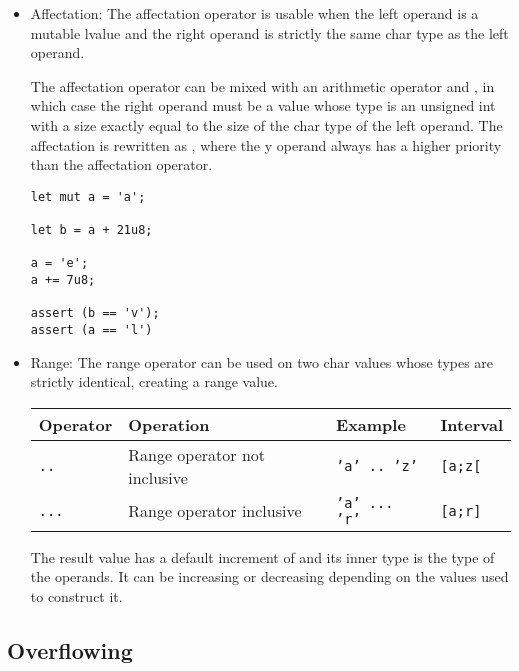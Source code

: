 \begin{itemize}
\item Affectation: The affectation operator \token{=} is usable when the left
  operand is a mutable lvalue and the right operand is strictly the same char
  type as the left operand.

  The affectation operator can be mixed with an arithmetic operator \token{+=}
  and \token{-=}, in which case the right operand must be a value whose type is
  an unsigned int with a size exactly equal to the size of the char type of the
  left operand. The affectation  is rewritten as , where the y operand always has a higher priority than the affectation
  operator.

  \begin{lstlisting}[style=coloredverbatim]
let mut a = 'a';

let b = a + 21u8;

a = 'e';
a += 7u8;

assert (b == 'v');
assert (a == 'l')
  \end{lstlisting}

\item Range: The range operator can be used on two char values whose types are
  strictly identical, creating a range value.

  \begin{center}
    \vspace{-10pt}\begin{adjustbox}{max width=1.0\linewidth}
      \begin{tabular}{|l|lll|}
        \hline
        Operator & Operation & Example & Interval\\[0pt]
        \hline
        \hline
        \texttt{..} & Range operator not inclusive & \texttt{'a' .. 'z'} & \texttt{[a;z[}\\[0pt]
            \texttt{...} & Range operator inclusive & \texttt{'a' ... 'r'} & \texttt{[a;r]}\\[0pt]
            \hline
      \end{tabular}
  \end{adjustbox}\end{center}


  The result value has a default increment of  and its inner type is
  the type of the operands. It can be increasing or decreasing depending on the
  values used to construct it.

\end{itemize}

\subsection{Overflowing}
\label{sec:orga9c18c5}

